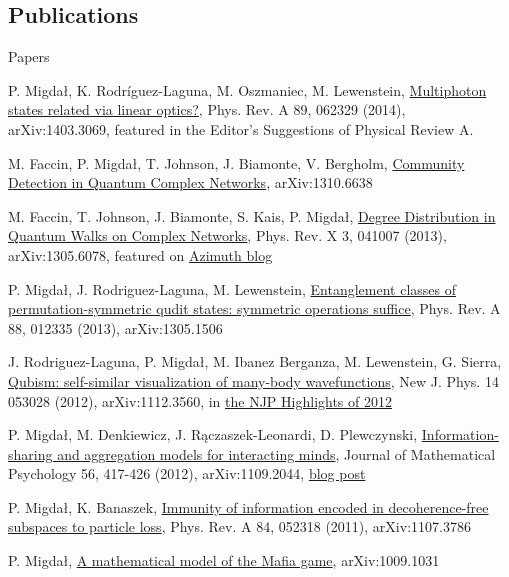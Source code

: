 \documentclass[margin,line]{resume}
\begin{document}
\begin{resume}
    \section{\mysidestyle Publications}
    Papers
    \begin{list2}
        \item P. Migdał, K. Rodríguez-Laguna, M. Oszmaniec, M. Lewenstein,
        \href{http://arxiv.org/abs/1403.3069}{Multiphoton states related via linear optics?}, Phys. Rev. A 89, 062329 (2014), arXiv:1403.3069,
        featured in the Editor's Suggestions of Physical Review A. 
        \item M. Faccin, P. Migdał, T. Johnson, J. Biamonte, V. Bergholm,
        \href{http://arxiv.org/abs/1310.6638}{Community Detection in Quantum Complex Networks}, arXiv:1310.6638
        \item M. Faccin, T. Johnson, J. Biamonte, S. Kais, P. Migdał,
        \href{http://arxiv.org/abs/1305.6078}{Degree Distribution in Quantum Walks on Complex Networks},
        Phys. Rev. X 3, 041007 (2013),
        arXiv:1305.6078,
        featured on \href{http://johncarlosbaez.wordpress.com/2013/08/05/quantum-network-theory-part-1/}{Azimuth blog}
        \item P. Migdał, J. Rodriguez-Laguna, M. Lewenstein,
        \href{http://arxiv.org/abs/1305.1506}{Entanglement classes of permutation-symmetric qudit states: symmetric operations suffice},
        Phys. Rev. A 88, 012335 (2013), arXiv:1305.1506
        \item J. Rodriguez-Laguna, P. Migdał, M. Ibanez Berganza, M. Lewenstein, G. Sierra, \href{http://dx.doi.org/10.1088/1367-2630/14/5/053028}{Qubism: self-similar visualization of many-body wavefunctions}, New J. Phys. 14 053028 (2012), arXiv:1112.3560,
        in \href{http://iopscience.iop.org/1367-2630/page/Highlights%20of%202012}{the NJP Highlights of 2012}
		\item P. Migdał, M. Denkiewicz, J. Rączaszek-Leonardi, D. Plewczynski, \href{http://arxiv.org/abs/1109.2044}{Information-sharing and aggregation models for interacting minds},
        Journal of Mathematical Psychology 56, 417-426 (2012),
        arXiv:1109.2044,
        \href{http://egtheory.wordpress.com/2014/01/30/two-heads-are-better-than-one-how-about-more/}{blog post}
        \item P. Migdał, K. Banaszek, \href{http://arxiv.org/abs/1107.3786}{Immunity of information encoded in decoherence-free subspaces to particle loss}, Phys. Rev. A 84, 052318 (2011), arXiv:1107.3786
    	\item P. Migdał, \href{http://arxiv.org/abs/1009.1031}{A mathematical model of the Mafia game}, arXiv:1009.1031

\end{list2}
\end{resume}
\end{document}
